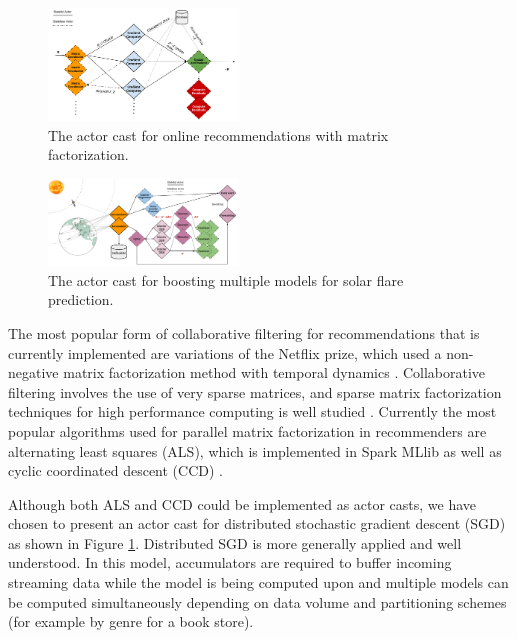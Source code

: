 \documentclass[conference,twocolumn,10pt]{IEEEtran}
\begin{document}
\begin{figure}[!t]
    \centering
    \includegraphics[width=0.45\textwidth]{nnmf_cast}
    \caption{The actor cast for online recommendations with matrix factorization.}
    \label{fig:nnmf_cast}
\end{figure}

\begin{figure}[!t]
    \centering
    \includegraphics[width=0.45\textwidth]{solar_cast}
    \caption{The actor cast for boosting multiple models for solar flare prediction.}
    \label{fig:solar_cast}
\end{figure}

The most popular form of collaborative filtering for recommendations that is currently implemented are variations of the Netflix prize, which used a non-negative matrix factorization method with temporal dynamics \cite{koren_collaborative_2010}. Collaborative filtering involves the use of very sparse matrices, and sparse matrix factorization techniques for high performance computing is well studied \cite{gupta_highly_1997}. Currently the most popular algorithms used for parallel matrix factorization in recommenders are alternating least squares (ALS), which is implemented in Spark MLlib as well as cyclic coordinated descent (CCD) \cite{yu_scalable_2012}.

Although both ALS and CCD could be implemented as actor casts, we have chosen to present an actor cast for distributed stochastic gradient descent (SGD) \cite{gemulla_large-scale_2011} as shown in Figure \ref{fig:nnmf_cast}. Distributed SGD is more generally applied and well understood. In this model, accumulators are required to buffer incoming streaming data while the model is being computed upon and multiple models can be computed simultaneously depending on data volume and partitioning schemes (for example by genre for a book store).
\end{document}
